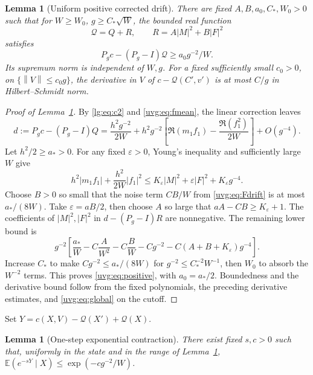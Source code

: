 \documentclass[11pt]{article}
\numberwithin{equation}{section}
\newtheorem{lemma}[theorem]{Lemma}
\theoremstyle{remark}
\newcommand{\E}{\mathbb E}
\newcommand{\norm}[1]{\left\|#1\right\|}
\begin{document}
\begin{lemma}[Uniform positive corrected drift]\label{uvg:lem:positive}
There are fixed \(A,B,a_0,C_*,W_0>0\) such that for
\(W\ge W_0\), \(g\ge C_*\sqrt W\), the bounded real function
\[
 \mathcal Q=Q+R,\qquad R=A|M|^2+B|F|^2
\]
satisfies
\begin{equation}\label{uvg:eq:positive}
 P_gc-(P_g-I)\mathcal Q\ge a_0g^{-2}/W.
\end{equation}
Its supremum norm is independent of \(W,g\). For a fixed sufficiently
small $c_0>0$, on \(\{\norm V\le c_0g\}\), the derivative in $V$ of
\(c-\mathcal Q(C',v')\) is at most \(C/g\) in Hilbert--Schmidt norm.
\end{lemma}

\begin{proof}[Proof of Lemma~\ref{uvg:lem:positive}]
By \eqref{lg:eq:c2} and \eqref{uvg:eq:fmean}, the linear correction leaves
\[
 d:=P_gc-(P_g-I)Q=\frac{h^2g^{-2}}{2W}
 +h^2g^{-2}\left[\Re(m_1f_1)-\frac{\Re(f_1^2)}{2W}\right]+O(g^{-4}).
\]
Let \(h^2/2\ge a_*>0\). For any fixed \(\varepsilon>0\),
Young's inequality and sufficiently large \(W\) give
\[
 h^2|m_1f_1|+\frac{h^2}{2W}|f_1|^2
 \le K_\varepsilon|M|^2+\varepsilon|F|^2
                                     +K_\varepsilon g^{-4}.
\]
Choose \(B>0\) so small that the noise term \(CB/W\)
from \eqref{uvg:eq:Fdrift} is at most \(a_*/(8W)\).
Take \(\varepsilon=aB/2\), then choose \(A\) so large that
\(aA-CB\ge K_\varepsilon+1\).
The coefficients of \(|M|^2,|F|^2\) in
\(d-(P_g-I)R\) are nonnegative. The remaining lower bound is
\[
 g^{-2}\left[\frac{a_*}{W}-C\frac A{W^2}-C\frac B W
              -Cg^{-2}-C(A+B+K_\varepsilon)g^{-4}\right].
\]
Increase \(C_*\) to make \(Cg^{-2}\le a_*/(8W)\) for
\(g^{-2}\le C_*^{-2}W^{-1}\), then \(W_0\) to absorb the \(W^{-2}\)
terms. This proves \eqref{uvg:eq:positive}, with \(a_0=a_*/2\).
Boundedness and the derivative bound follow from the fixed
polynomials, the preceding derivative estimates, and
\eqref{uvg:eq:global} on the cutoff.
\end{proof}

Set $Y=c(X,V)-\mathcal Q(X')+\mathcal Q(X)$.

\begin{lemma}[One-step exponential contraction]\label{uvg:lem:mgf}
There exist fixed \(s,c>0\) such that, uniformly in the state and in the range of
Lemma~\ref{uvg:lem:positive},
\(\E(e^{-sY}\mid X)\le\exp(-cg^{-2}/W)\).
\end{lemma}
\end{document}
